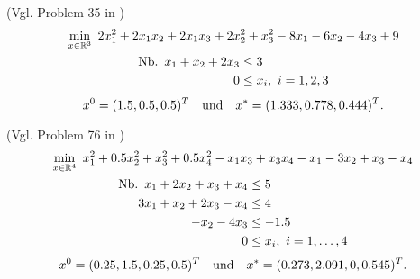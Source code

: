 \begin{testproblem}
(Vgl. Problem 35 in \cite[S.~58]{hock})
\begin{gather}
\min_{x\in\R^3}\ 2 x_1^2 + 2 x_1 x_2 + 2 x_1 x_3 + 2 x_2^2 + x_3^2 - 8 x_1 - 6 x_2 - 4 x_3 + 9 \notag \\
\begin{split}
\nb x_1 + x_2 + 2 x_3 & \leq 3 \\
0 & \leq x_i,\ i = 1,2,3 \\
\end{split}
\end{gather}
\begin{equation*}
x^0 = (1.5, 0.5, 0.5)^T \quad\text{und}\quad x^* = (1.333, 0.778, 0.444)^T.
\end{equation*}
\end{testproblem}

\begin{testproblem}
(Vgl. Problem 76 in \cite[S.~96]{hock})
\begin{gather}
\min_{x\in\R^4}\ x_1^2 + 0.5 x_2^2 + x_3^2 + 0.5 x_4^2 - x_1 x_3 + x_3 x_4 - x_1 - 3 x_2 + x_3 - x_4 \notag \\
\begin{split}
\nb x_1 + 2 x_2 + x_3 + x_4 & \leq 5 \\
3 x_1 + x_2 + 2 x_3 - x_4 & \leq 4 \\
-x_2 - 4 x_3 & \leq -1.5 \\
0 & \leq x_i,\ i = 1,\ldots,4 \\
\end{split}
\end{gather}
\begin{equation*}
x^0 = (0.25, 1.5, 0.25, 0.5)^T \quad\text{und}\quad x^* = (0.273, 2.091, 0, 0.545)^T.
\end{equation*}
\end{testproblem}
